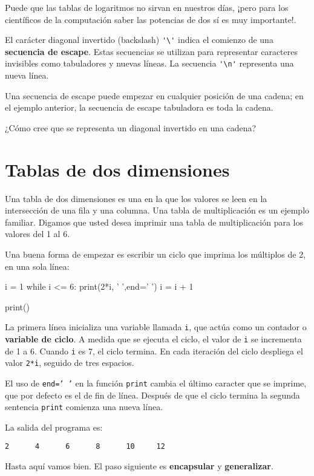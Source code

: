 Puede que las tablas de logaritmos no sirvan en nuestros días, ¡pero
para los científicos de la computación saber las potencias de dos
sí es muy importante!.


El carácter diagonal invertido (backslash) \verb+'\'+ indica el comienzo
de una \textbf{secuencia de escape}. Estas secuencias se utilizan
para representar caracteres invisibles como tabuladores y nuevas líneas.
La secuencia \verb+'\n'+ representa una nueva línea.

Una secuencia de escape puede empezar en cualquier posición de una
cadena; en el ejemplo anterior, la secuencia de escape tabuladora
es toda la cadena.

¿Cómo cree que se representa un diagonal invertido en una cadena?

\section{Tablas de dos dimensiones}


Una tabla de dos dimensiones es una en la que los valores se leen
en la intersección de una fila y una columna. Una tabla de multiplicación
es un ejemplo familiar. Digamos que usted desea imprimir una tabla
de multiplicación para los valores del 1 al 6.

Una buena forma de empezar es escribir un ciclo que imprima los múltiplos
de 2, en una sola línea:
\begin{pythoncode}
i = 1
while i <= 6:
  print(2*i, '   ',end=' ')
  i = i + 1

print()
\end{pythoncode}

La primera línea inicializa una variable llamada \texttt{i}, que actúa
como un contador o \textbf{variable de ciclo}. A medida que se ejecuta
el ciclo, el valor de \texttt{i} se incrementa de 1 a 6. Cuando \texttt{i}
es 7, el ciclo termina. En cada iteración del ciclo despliega el valor
\texttt{2{*}i}, seguido de tres espacios.

El uso de \texttt{end=' '} en la función \texttt{print} cambia el
último caracter que se imprime, que por defecto es el de fin de línea.
Después de que el ciclo termina la segunda sentencia \texttt{print}
comienza una nueva línea.

La salida del programa es:
\begin{verbatim}
2      4      6      8      10     12
\end{verbatim}
Hasta aquí vamos bien. El paso siguiente es \textbf{encapsular} y
\textbf{generalizar}.


